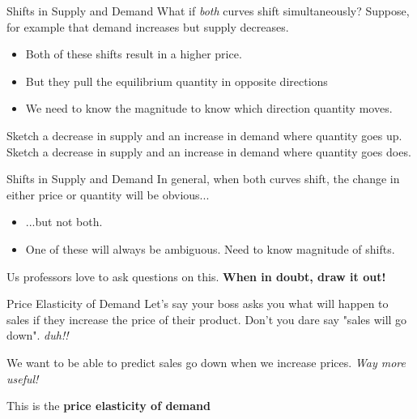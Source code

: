 \documentclass[12pt,t]{beamer}
\begin{document}
\begin{frame}{Shifts in Supply and Demand}
  What if \textit{both} curves shift simultaneously? Suppose, for example that demand increases but supply decreases.

  \begin{itemize}
    \item Both of these shifts result in a higher price.

    \item But they pull the equilibrium quantity in opposite directions

    \item We need to know the magnitude to know which direction quantity moves.
  \end{itemize}
\end{frame}

\begin{frame}

  \bigskip
  Sketch a decrease in supply and an increase in demand where quantity goes up.
  Sketch a decrease in supply and an increase in demand where quantity goes does.
\end{frame}

\begin{frame}{Shifts in Supply and Demand}
  In general, when both curves shift, the change in either price or quantity will be obvious...

  \begin{itemize}
    \item ...but not both.

    \item One of these will always be ambiguous. Need to know magnitude of shifts.
  \end{itemize}

  \pause\bigskip
  Us professors love to ask questions on this. \textbf{When in doubt, draw it out!}
\end{frame}

\begin{frame}{Price Elasticity of Demand}
  Let's say your boss asks you what will happen to sales if they increase the price of their product. Don't you dare say "sales will go down". 
  \emph{duh!!}

  \pause\bigskip
  We want to be able to predict  sales go down when we increase prices. \emph{Way more useful!}

  \pause\bigskip
  This is the \textbf{price elasticity of demand}
\end{frame}
\end{document}
